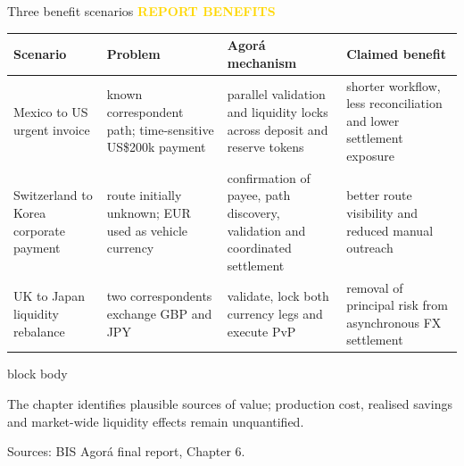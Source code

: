 \documentclass[aspectratio=169,12pt]{beamer}
\newcommand{\source}[1]{\vfill\par\fontsize{5.4}{6.5}\selectfont\color{Quiet}Sources: #1}
\newcommand{\reporttag}[1]{\textcolor{Gold}{\fontsize{7.2}{8.5}\selectfont\bfseries REPORT #1}}
\newenvironment{statement}{%
  \begin{beamercolorbox}[sep=.18cm,rounded=false,wd=\linewidth]{block body}%
  \fontsize{13}{15.5}\selectfont\bfseries
}{\end{beamercolorbox}}
\begin{document}
\begin{frame}[shrink=30]{Three benefit scenarios}
  \reporttag{BENEFITS}\par\vspace{0.08cm}
  \fontsize{8.25}{9.9}\selectfont
  \begin{tabularx}{\textwidth}{L{2.15cm}L{2.35cm}Y Y}
    \toprule
    \textbf{Scenario} & \textbf{Problem} & \textbf{Agor\'a mechanism} & \textbf{Claimed benefit} \\
    \midrule
    Mexico to US urgent invoice & known correspondent path; time-sensitive US\$200k payment & parallel validation and liquidity locks across deposit and reserve tokens & shorter workflow, less reconciliation and lower settlement exposure \\
    Switzerland to Korea corporate payment & route initially unknown; EUR used as vehicle currency & confirmation of payee, path discovery, validation and coordinated settlement & better route visibility and reduced manual outreach \\
    UK to Japan liquidity rebalance & two correspondents exchange GBP and JPY & validate, lock both currency legs and execute PvP & removal of principal risk from asynchronous FX settlement \\
    \bottomrule
  \end{tabularx}
  \vspace{0.10cm}
  \begin{statement}
    The chapter identifies plausible sources of value; production cost, realised savings and market-wide liquidity effects remain unquantified.
  \end{statement}
  \source{BIS Agor\'a final report, Chapter 6.}
\end{frame}
\end{document}
